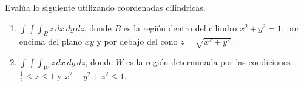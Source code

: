 Evalúa lo siguiente utilizando coordenadas cilíndricas.

\begin{enumerate}
	\item  \( \int \int \int_B z \, dx \, dy \, dz \), donde \( B \) es la región dentro del cilindro \( x^2 + y^2 = 1 \), por encima del plano \( xy \) y por debajo del cono \( z = \sqrt{x^2 + y^2} \).
	\item \( \int \int \int_W z \, dx \, dy \, dz \), donde \( W \) es la región determinada por las condiciones  \( \frac{1}{2} \leq z \leq 1 \) y \( x^2 + y^2 + z^2 \leq 1 \).
\end{enumerate}